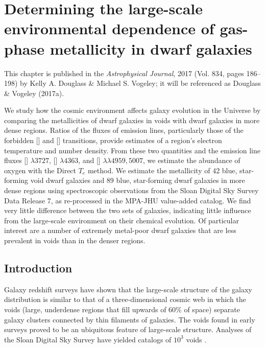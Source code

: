 \chapter[Metallicity of dwarf galaxies]{Determining the large-scale environmental dependence of gas-phase metallicity in dwarf galaxies}

This chapter is published in the \emph{Astrophysical Journal}, 2017 (Vol. 834, 
pages 186--198) by Kelly A. Douglass \& Michael S. Vogeley; it will be 
referenced as Douglass \& Vogeley (2017a).


\begin{chapabstract}
We study how the cosmic environment affects galaxy evolution in the Universe by 
comparing the metallicities of dwarf galaxies in voids with dwarf galaxies in 
more dense regions.  Ratios of the fluxes of emission lines, particularly those 
of the forbidden [] and [] transitions, provide estimates of 
a region's electron temperature and number density.  From these two quantities 
and the emission line fluxes [] $\lambda 3727$, [] 
$\lambda 4363$, and [] $\lambda \lambda 4959,5007$, we estimate the 
abundance of oxygen with the Direct $T_e$ method.  We estimate the metallicity 
of 42 blue, star-forming void dwarf galaxies and 89 blue, star-forming dwarf 
galaxies in more dense regions using spectroscopic observations from the Sloan 
Digital Sky Survey Data Release 7, as re-processed in the MPA-JHU value-added 
catalog.  We find very little difference between the two sets of galaxies, 
indicating little influence from the large-scale environment on their chemical 
evolution.  Of particular interest are a number of extremely metal-poor dwarf 
galaxies that are less prevalent in voids than in the denser regions.
\end{chapabstract}


\section{Introduction}


Galaxy redshift surveys have shown that the large-scale structure of the galaxy 
distribution is similar to that of a three-dimensional cosmic web \citep{Bond96} 
in which the voids (large, underdense regions that fill upwards of 60\% of 
space) separate galaxy clusters connected by thin filaments of galaxies.  The 
voids found in early surveys \citep[e.g.,][]{Gregory78, Kirshner81, 
deLapparent86} proved to be an ubiquitous feature of large-scale structure.  
Analyses of the Sloan Digital Sky Survey \citep{Abazajian09, Ahn12} have yielded 
catalogs of $10^3$ voids \citep{Pan12, Sutter14}.

